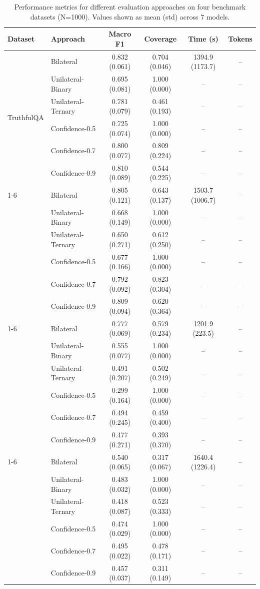 \begin{table}[htbp]
\centering
\caption{Performance metrics for different evaluation approaches on four benchmark datasets (N=1000). Values shown as mean (std) across 7 models.}
\begin{tabular}{llcccc}
\toprule
\textbf{Dataset} & \textbf{Approach} & \textbf{Macro F1} & \textbf{Coverage} & \textbf{Time (s)} & \textbf{Tokens} \\
\midrule
\multirow{6}{*}{TruthfulQA}
 & Bilateral & 0.832 (0.061) & 0.704 (0.046) & 1394.9 (1173.7) & -- \\
 & Unilateral-Binary & 0.695 (0.081) & 1.000 (0.000) & -- & -- \\
 & Unilateral-Ternary & 0.781 (0.079) & 0.461 (0.193) & -- & -- \\
 & Confidence-0.5 & 0.725 (0.074) & 1.000 (0.000) & -- & -- \\
 & Confidence-0.7 & 0.800 (0.077) & 0.809 (0.224) & -- & -- \\
 & Confidence-0.9 & 0.810 (0.089) & 0.544 (0.225) & -- & -- \\
\cline{1-6}
\multirow{6}{*}{SimpleQA}
 & Bilateral & 0.805 (0.121) & 0.643 (0.137) & 1503.7 (1006.7) & -- \\
 & Unilateral-Binary & 0.668 (0.149) & 1.000 (0.000) & -- & -- \\
 & Unilateral-Ternary & 0.650 (0.271) & 0.612 (0.250) & -- & -- \\
 & Confidence-0.5 & 0.677 (0.166) & 1.000 (0.000) & -- & -- \\
 & Confidence-0.7 & 0.792 (0.092) & 0.823 (0.304) & -- & -- \\
 & Confidence-0.9 & 0.809 (0.094) & 0.620 (0.364) & -- & -- \\
\cline{1-6}
\multirow{6}{*}{MMLU-Pro}
 & Bilateral & 0.777 (0.069) & 0.579 (0.234) & 1201.9 (223.5) & -- \\
 & Unilateral-Binary & 0.555 (0.077) & 1.000 (0.000) & -- & -- \\
 & Unilateral-Ternary & 0.491 (0.207) & 0.502 (0.249) & -- & -- \\
 & Confidence-0.5 & 0.299 (0.164) & 1.000 (0.000) & -- & -- \\
 & Confidence-0.7 & 0.494 (0.245) & 0.459 (0.400) & -- & -- \\
 & Confidence-0.9 & 0.477 (0.271) & 0.393 (0.370) & -- & -- \\
\cline{1-6}
\multirow{6}{*}{FACTScore}
 & Bilateral & 0.540 (0.065) & 0.317 (0.067) & 1640.4 (1226.4) & -- \\
 & Unilateral-Binary & 0.483 (0.032) & 1.000 (0.000) & -- & -- \\
 & Unilateral-Ternary & 0.418 (0.087) & 0.523 (0.333) & -- & -- \\
 & Confidence-0.5 & 0.474 (0.029) & 1.000 (0.000) & -- & -- \\
 & Confidence-0.7 & 0.495 (0.022) & 0.478 (0.171) & -- & -- \\
 & Confidence-0.9 & 0.457 (0.037) & 0.311 (0.149) & -- & -- \\
\bottomrule
\end{tabular}
\end{table}

